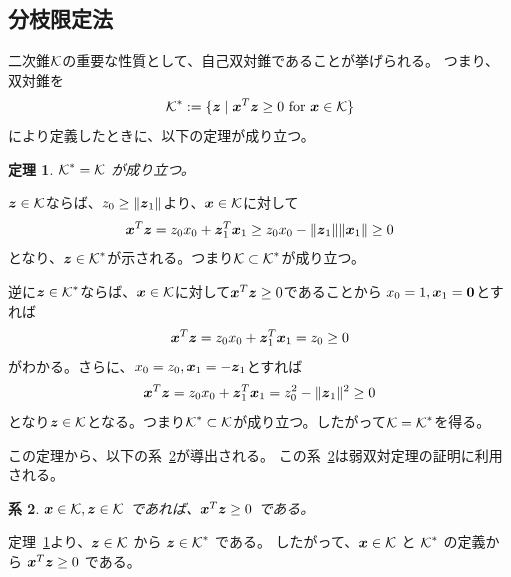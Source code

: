 \documentclass[11pt,a4paper,dvipdfmx,titlepage,uplatex]{jsarticle}
\makeatletter
\theoremstyle{mystyle}
\renewenvironment{proof}[1][\proofname]{\par
  \pushQED{\qed}%
  \normalfont \topsep6\p@\@plus6\p@\relax
  \trivlist
  \item\relax
  {\bfseries
  #1\@addpunct{.}}\hspace\labelsep\ignorespaces
}{%
  \popQED\endtrivlist\@endpefalse
}
\newcommand{\0}{\mathbf{0}}
\newtheorem{theorem}{定理}
\newtheorem{corollary}[theorem]{系}
\def\0{\mbox{\bf 0}}
\def\x{\mbox{\boldmath $x$}}
\def\z{\mbox{\boldmath $z$}}
\def\KC{\mbox{$\cal K$}}
\makeatother
\begin{document}
\subsection{分枝限定法}\label{sec:cone-property}
二次錐$\KC$の重要な性質として、自己双対錐であることが挙げられる。
つまり、双対錐を
\begin{align}
	\KC^* := \{ \z \mid \x^T \z \ge 0 \ \text{for} \ \x \in \KC \}\label{eq:dual-cone}
\end{align}
により定義したときに、以下の定理が成り立つ。

\begin{theorem}\label{theorem:cone-property}
	$\KC^* = \KC$ が成り立つ。
\end{theorem}

\begin{proof}
	$\z \in \KC$ならば、$z_0 \ge \|\z_1\|$より、$\x \in \KC$に対して
  \begin{align}
    \x^T \z = z_0 x_0 + \z_1^T \x_1 \ge z_0 x_0 - \|\z_1\| \|\x_1\| \ge 0
  \end{align}
  となり、$\z \in \KC^*$が示される。つまり$\KC \subset \KC^*$が成り立つ。

  逆に$\z \in \KC^*$ならば、$\x \in \KC$に対して$\x^T \z \ge 0$であることから
  $x_0 = 1 , \x_1 = \0$とすれば
  \begin{align}
    \x^T \z = z_0 x_0 + \z_1^T \x_1 = z_0 \ge 0
  \end{align}
  がわかる。さらに、$x_0 = z_0 , \x_1 = - \z_1$とすれば
  \begin{align}
    \x^T \z = z_0 x_0 + \z_1^T \x_1 = z_0^2 - \|\z_1\|^2 \ge 0
  \end{align}
  となり$\z \in \KC$となる。つまり$\KC^* \subset \KC$が成り立つ。したがって$\KC = \KC^*$を得る。
\end{proof}

この定理から、以下の系~\ref{corollary:cone-property}が導出される。
この系~\ref{corollary:cone-property}は弱双対定理の証明に利用される。

\begin{corollary}\label{corollary:cone-property}
	$\x \in \KC, \z \in \KC$ であれば、$\x^T \z \ge 0$ である。
\end{corollary}
\begin{proof}
	定理~\ref{theorem:cone-property}より、$\z \in \KC $ から
	$\z \in \KC^*$ である。
	したがって、$\x \in \KC$ と $\KC^*$ の定義から $\x^T \z \ge 0$ である。
\end{proof}
\end{document}

